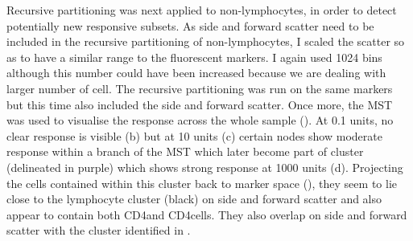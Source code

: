 Recursive partitioning was next applied to non-lymphocytes, in order to detect potentially new responsive subsets.
As side and forward scatter need to be included in the recursive partitioning of non-lymphocytes, I scaled the scatter so as to have a similar range to the fluorescent markers.
I again used 1024 bins although this number could have been increased because we are dealing with larger number of cell.
The recursive partitioning was run on the same markers but this time also included the side and forward scatter.
Once more, the MST was used to visualise the response across the whole sample ().
At 0.1 units, no clear response is visible (b) but at 10 units (c) certain nodes show moderate response within a branch of the MST which later become part of cluster (delineated in purple) which shows strong response at 1000 units (d).
Projecting the cells contained within this cluster back to marker space (), they seem to lie close to the lymphocyte cluster (black) on side and forward scatter and also appear to contain both CD4\negative and CD4\positive cells.
They also overlap on side and forward scatter with the cluster identified in .

